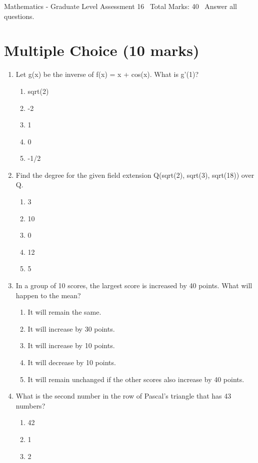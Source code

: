 \documentclass[12pt]{article}
\begin{document}
\begin{center}
Mathematics - Graduate Level Assessment 16 \
Total Marks: 40 \
Answer all questions.
\end{center}

\section*{Multiple Choice (10 marks)}
\begin{enumerate}[label=\arabic*.]
\item Let g(x) be the inverse of f(x) = x + cos(x). What is g'(1)?
\begin{enumerate}[label=(\alph*)]
    \item sqrt(2)
    \item -2
    \item 1
    \item 0
    \item -1/2
\end{enumerate}
\item Find the degree for the given field extension Q(sqrt(2), sqrt(3), sqrt(18)) over Q.
\begin{enumerate}[label=(\alph*)]
    \item 3
    \item 10
    \item 0
    \item 12
    \item 5
\end{enumerate}
\item In a group of 10 scores, the largest score is increased by 40 points. What will happen to the mean?
\begin{enumerate}[label=(\alph*)]
    \item It will remain the same.
    \item It will increase by 30 points.
    \item It will increase by 10 points.
    \item It will decrease by 10 points.
    \item It will remain unchanged if the other scores also increase by 40 points.
\end{enumerate}
\item What is the second number in the row of Pascal's triangle that has 43 numbers?
\begin{enumerate}[label=(\alph*)]
    \item 42
    \item 1
    \item 2

\end{enumerate}
\end{enumerate}
\end{document}
